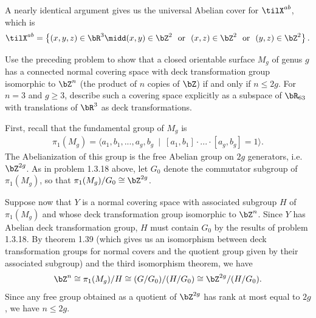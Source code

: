 \begin{homework}[e]
\begin{prf}
    A nearly identical argument gives us the universal Abelian cover for $\tilX^{ab}$, which is 
    \begin{align*}
      \tilX^{ab} = \left\{(x,y,z) \in \bR^3 \midd (x,y) \in \bZ^2 ~\text{ or }~ (x,z) \in \bZ^2 ~\text{ or }~ (y,z)\in \bZ^2\right\}.
    \end{align*}
  \end{prf}

   Use the preceding problem to show that a closed orientable surface $M_g$ of genus $g$ has a connected normal covering space with deck transformation group isomorphic to $\bZ^n$ (the product of $n$ copies of $\bZ$) if and only if $n \leq 2g$. For $n = 3$ and $g \geq 3$, describe such a covering space explicitly as a subspace of $\bR_{63}$ with translations of $\bR^3$ as deck transformations.
  \begin{prf}
    First, recall that the fundamental group of $M_g$ is
    \begin{align*}
      \pi_1(M_g) = \langle a_1,b_1,...,a_g,b_g ~\mid~ [a_1,b_1]\cdot...\cdot[a_g,b_g] = 1 \rangle.
    \end{align*}
    The Abelianization of this group is the free Abelian group on $2g$ generators, i.e. $\bZ^{2g}$. As in problem 1.3.18 above, let $G_0$ denote the commutator subgroup of $\pi_1(M_g)$, so that $\pi_1(M_g)/G_0 \cong \bZ^{2g}$.

    Suppose now that $Y$ is a normal covering space with associated subgroup $H$ of $\pi_1(M_g)$ and whose deck transformation group isomorphic to $\bZ^n$. Since $Y$ has Abelian deck transformation group, $H$ must contain $G_0$ by the results of problem 1.3.18. By theorem 1.39 (which gives us an isomorphism between deck transformation groups for normal covers and the quotient group given by their associated subgroup) and the third isomorphism theorem, we have
    \begin{align*}
      \bZ^n \cong \pi_1(M_g)/H \cong (G/G_0)/(H/G_0) \cong \bZ^{2g}/(H/G_0).
    \end{align*}
    Since any free group obtained as a quotient of $\bZ^{2g}$ has rank at most equal to $2g$, we have $n \leq 2g$.

    \bigskip


\end{prf}
\end{homework}
